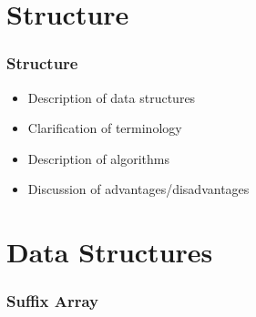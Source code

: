 \documentclass[compress,handout]{beamer} %
\begin{document}
\section{Structure}

\begin{frame}
	\frametitle{Structure}
	\begin{itemize}
		\item Description of data structures
		\item Clarification of terminology
		\item Description of algorithms
		\item Discussion of advantages/disadvantages
	\end{itemize}
\end{frame}

\section{Data Structures}

\begin{frame}
	\frametitle{Suffix Array}
\end{frame}
\end{document}
